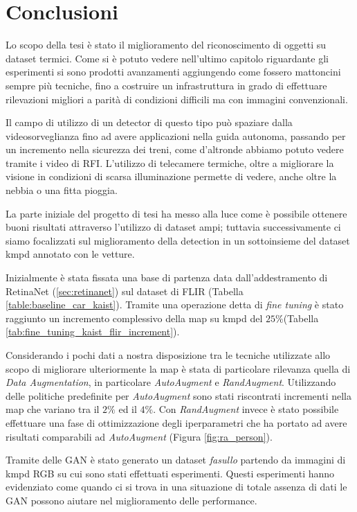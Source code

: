 \chapter{Conclusioni}
Lo scopo della tesi è stato il miglioramento del riconoscimento di oggetti su dataset termici. Come si è potuto vedere nell'ultimo capitolo riguardante gli esperimenti si sono prodotti avanzamenti aggiungendo come fossero mattoncini sempre più tecniche, fino a costruire un infrastruttura in grado di effettuare rilevazioni migliori a parità di condizioni difficili ma con immagini convenzionali. 

Il campo di utilizzo di un detector di questo tipo può spaziare dalla videosorveglianza fino ad avere applicazioni nella guida autonoma, passando per un incremento nella sicurezza dei treni, come d'altronde abbiamo potuto vedere tramite i video di \ac{RFI}. L'utilizzo di telecamere termiche, oltre a migliorare la visione in condizioni di scarsa illuminazione permette di vedere, anche oltre la nebbia o una fitta pioggia. 

La parte iniziale del progetto di tesi ha messo alla luce come è possibile ottenere buoni risultati attraverso l'utilizzo di dataset ampi; tuttavia successivamente ci siamo focalizzati sul miglioramento della detection in un sottoinsieme del dataset \ac{kmpd} annotato con le vetture.

Inizialmente è stata fissata una base di partenza data dall'addestramento di RetinaNet (\ref{sec:retinanet}) sul dataset di FLIR (Tabella \ref{table:baseline_car_kaist}). Tramite una operazione detta di \textit{fine tuning} è stato raggiunto un incremento complessivo della \ac{map} su \ac{kmpd} del $25\%$(Tabella \ref{tab:fine_tuning_kaist_flir_increment}).

Considerando i pochi dati a nostra disposizione tra le tecniche utilizzate allo scopo di migliorare ulteriormente la \ac{map} è stata di particolare rilevanza quella di \textit{Data Augmentation}, in particolare \textit{AutoAugment} e \textit{RandAugment}. 
Utilizzando delle politiche predefinite per \textit{AutoAugment} sono stati riscontrati incrementi nella \ac{map} che variano tra il $2\%$ ed il $4\%$. Con \textit{RandAugment} invece è stato possibile effettuare una fase di ottimizzazione degli iperparametri che ha portato ad avere risultati comparabili ad \textit{AutoAugment} (Figura \ref{fig:ra_person}). 

Tramite delle \acf{GAN} è stato generato un dataset \textit{fasullo} partendo da immagini di \ac{kmpd} RGB su cui sono stati effettuati esperimenti. Questi esperimenti hanno evidenziato come quando ci si trova in una situazione di totale assenza di dati le \ac{GAN} possono aiutare nel miglioramento delle performance. 

